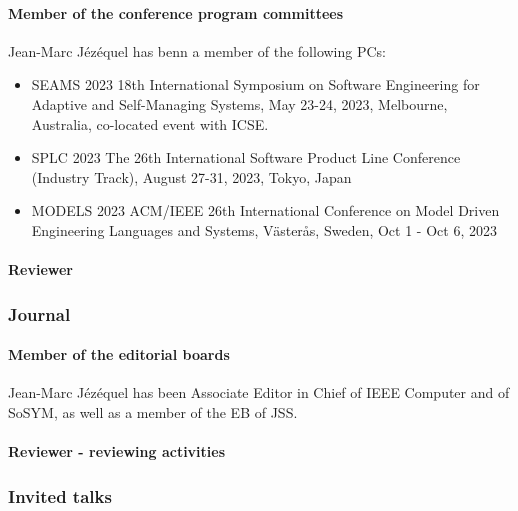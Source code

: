 \paragraph{Member of the conference program committees}
\label{DIVERSE:animation-eventselect-member}
Jean-Marc Jézéquel has benn a member of the following PCs:
\begin{itemize}
\item SEAMS 2023 18th International Symposium on Software Engineering for Adaptive and Self-Managing Systems, May 23-24, 2023, Melbourne, Australia, co-located event with ICSE.
\item SPLC 2023 The 26th International Software Product Line Conference (Industry Track), August 27-31, 2023, Tokyo, Japan
\item MODELS 2023 ACM/IEEE 26th International Conference on Model Driven Engineering Languages and Systems, Västerås, Sweden, Oct 1 - Oct 6, 2023
\end{itemize}

\paragraph{Reviewer}
\label{DIVERSE:animation-eventselect-review}

\subsubsection{Journal}
\label{DIVERSE:animation-journal}

\paragraph{Member of the editorial boards}
\label{DIVERSE:animation-journal-board}
Jean-Marc Jézéquel has been Associate Editor in Chief of IEEE Computer and of SoSYM, as well as a member of the EB of JSS.

\paragraph{Reviewer - reviewing activities}
\label{DIVERSE:animation-journal-review}

\subsubsection{Invited talks}
\label{DIVERSE:animation-talks}

